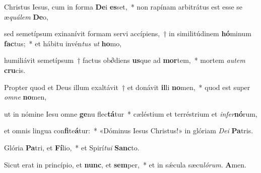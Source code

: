 \item Christus Iesus, cum in forma \textbf{De}i \textbf{es}set,~* non rapínam arbitrátus est esse se æ\textit{quálem} \textbf{De}o,

\item sed semetípsum exinanívit formam servi accípiens,~† in similitúdinem \textbf{hó}minum \textbf{fac}tus;~* et hábitu invén\textit{tus} \textit{ut} \textbf{ho}mo,

\item humiliávit semetípsum~† factus ob∂diens \textbf{us}que ad \textbf{mor}tem,~* mortem \textit{autem} \textbf{cru}cis.

\item Propter quod et Deus illum exaltávit~† et donávit \textbf{il}li \textbf{no}men,~* quod est super \textit{omne} \textbf{no}men,

\item ut in nómine Iesu omne \textbf{ge}nu flec\textbf{tá}tur~* cæléstium et terréstrium et \textit{infer}\textbf{nó}rum,

\item et omnis lingua con\textbf{fi}te\textbf{á}tur:~* «Dóminus Iesus Christus!» in glóriam \textit{Dei} \textbf{Pa}tris.

\item Glória \textbf{Pa}tri, et \textbf{Fí}lio,~* et Spirí\textit{tui} \textbf{Sanc}to.

\item Sicut erat in princípio, et \textbf{nunc}, et \textbf{sem}per,~* et in sǽcula sæcu\textit{lórum}. \textbf{A}men.

